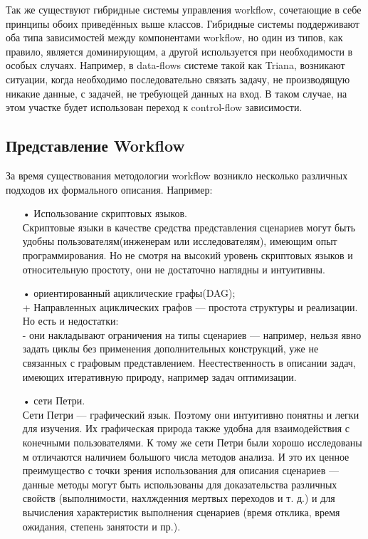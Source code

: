 \documentclass[a4paper,14pt]{article}
\begin{document}
Так же существуют гибридные системы управления workflow, сочетающие в себе принципы обоих приведённых выше классов. Гибридные системы поддерживают оба типа зависимостей между компонентами workflow, но  один из типов, как правило, является доминирующим, а другой используется при необходимости  в особых случаях. Например, в data-flows системе такой как Triana, возникают ситуации, когда необходимо последовательно связать задачу, не производящую никакие данные, с задачей, не  требующей данных на вход. В таком случае, на этом участке будет использован переход к control-flow зависимости.\\
  
\subsection*{Представление Workflow}
За время существования методологии workflow возникло несколько различных подходов их формального описания. Например:
\begin{enumerate}
\item[•] Использование скриптовых языков.\\
 Скриптовые языки в качестве средства представления сценариев могут быть удобны пользователям(инженерам или исследователям), имеющим опыт программирования. Но не смотря на высокий уровень скриптовых языков и относительную простоту, они не достаточно наглядны и интуитивны.\\
\item[•] ориентированный ациклические графы(DAG);\\
 + Направленных ациклических графов — простота структуры и реализации.
  Но есть и недостатки:\\
  - они накладывают ограничения на типы сценариев — например, нельзя явно задать циклы без применения дополнительных конструкций, уже не связанных с графовым представлением. Неестественность в описании задач, имеющих итеративную природу, например задач оптимизации. \\
\item[•] сети Петри.\\ 
 Сети Петри — графический язык. Поэтому они
интуитивно понятны и легки для изучения. Их графическая природа
также удобна для взаимодействия с конечными пользователями. К тому же сети Петри были хорошо исследованы м отличаются наличием большого числа методов анализа. И это их ценное преимущество с точки зрения использования для
описания сценариев — данные методы могут быть использованы для доказательства различных свойств (выполнимости, нахлжденния  мертвых переходов и т. д.) и для вычисления характеристик выполнения сценариев (время отклика, время ожидания, степень занятости и пр.).
\end{enumerate}
\end{document}
